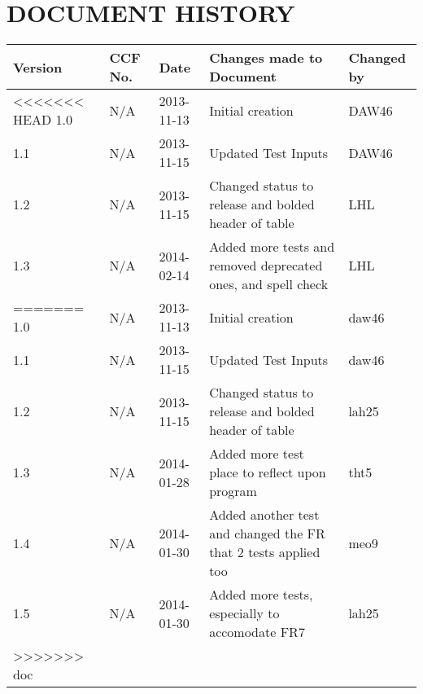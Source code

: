 \documentclass{project}
\begin{document}



\section*{DOCUMENT HISTORY}
\begin{flushleft}
\begin{tabular}{ | p{1.5cm} | p{1cm} | p{2cm} | p{6cm}| p{1.5cm}| }
\hline
Version & CCF No. & Date & Changes made to Document & Changed by \\
\hline

<<<<<<< HEAD
1.0 & N/A & 2013-11-13 & Initial creation & DAW46 \\ \hline
1.1 & N/A & 2013-11-15 & Updated Test Inputs & DAW46 \\ \hline
1.2 & N/A & 2013-11-15 & Changed status to release and bolded header of table & LHL \\ \hline
1.3 & N/A & 2014-02-14 & Added more tests and removed deprecated ones, and spell check & LHL \\ \hline

=======
1.0 & N/A & 2013-11-13 & Initial creation & daw46 \\ \hline
1.1 & N/A & 2013-11-15 & Updated Test Inputs & daw46 \\ \hline
1.2 & N/A & 2013-11-15 & Changed status to release and bolded header of table & lah25 \\ \hline
1.3 & N/A & 2014-01-28 & Added more test place to reflect upon program & tht5 \\ \hline
1.4 & N/A & 2014-01-30 & Added another test and changed the FR that 2 tests applied too & meo9 \\ \hline
1.5 & N/A & 2014-01-30 & Added more tests, especially to accomodate FR7 & lah25 \\ \hline
>>>>>>> doc
\end{tabular}
\end{flushleft}
\label{thelastpage}
\end{document}
